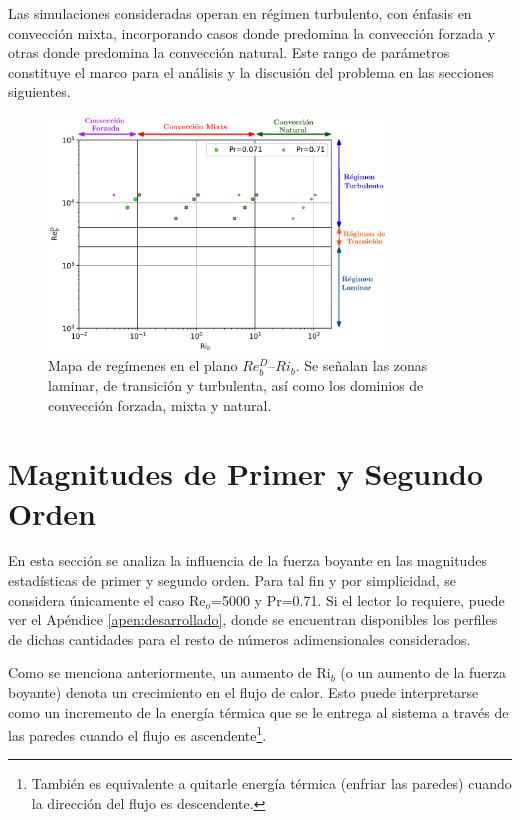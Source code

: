 Las simulaciones consideradas operan en régimen turbulento, con énfasis en convección mixta, incorporando casos donde predomina la convección forzada y otras donde predomina la convección natural. Este rango de parámetros constituye el marco para el análisis y la discusión del problema en las secciones siguientes.

\newpage

\begin{figure}[H]
  \centering
    \includegraphics[width=0.8\textwidth]{figures/cap5/map.eps}
  \caption{Mapa de regímenes en el plano $Re^D_b$–$Ri_b$. Se señalan las zonas laminar, de transición y turbulenta, así como los dominios de convección forzada, mixta y natural.}
  \label{fig:map_flow_regime}
\end{figure}

\section{Magnitudes de Primer y Segundo Orden}

En esta sección se analiza la influencia de la fuerza boyante en las magnitudes estadísticas de primer y segundo orden. Para tal fin y por simplicidad, se considera únicamente el caso Re$_o$=5000 y Pr=0.71. Si el lector lo requiere, puede ver el Apéndice \ref{apen:desarrollado}, donde se encuentran disponibles los perfiles de dichas cantidades para el resto de números adimensionales considerados.

Como se menciona anteriormente, un aumento de Ri$_b$ (o un aumento de la fuerza boyante) denota un crecimiento en el flujo de calor. Esto puede interpretarse como un incremento de la energía térmica que se le entrega al sistema a través de las paredes cuando el flujo es ascendente\footnote{También es equivalente a quitarle energía térmica (enfriar las paredes) cuando la dirección del flujo es descendente.}.

